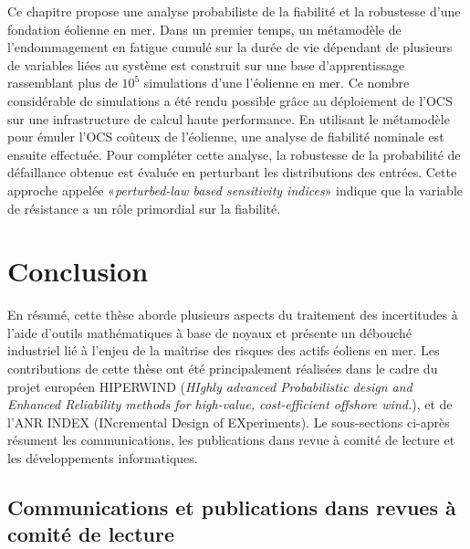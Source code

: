 Ce chapitre propose une analyse probabiliste de la fiabilit\'{e} et la robustesse d'une fondation \'{e}olienne en mer. 
Dans un premier temps, un m\'{e}tamodèle de l'endommagement en fatigue cumul\'{e} sur la dur\'{e}e de vie d\'{e}pendant de plusieurs de variables li\'{e}es au système est construit sur une base d'apprentissage rassemblant plus de $10^5$ simulations d'une l'\'{e}olienne en mer.
Ce nombre consid\'{e}rable de simulations a \'{e}t\'{e} rendu possible grâce au d\'{e}ploiement de l'OCS sur une infrastructure de calcul haute performance. 
En utilisant le m\'{e}tamodèle pour \'{e}muler l'OCS coûteux de l'\'{e}olienne, une analyse de fiabilit\'{e} nominale est ensuite effectu\'{e}e. 
Pour compl\'{e}ter cette analyse, la robustesse de la probabilit\'{e} de d\'{e}faillance obtenue est \'{e}valu\'{e}e en perturbant les distributions des entr\'{e}es. 
Cette approche appel\'{e}e «\textit{perturbed-law based sensitivity indices}» \citep{lemaitre_2015_PLI} indique que la variable de r\'{e}sistance a un rôle primordial sur la fiabilit\'{e}.



\section*{Conclusion}

En r\'{e}sum\'{e}, cette thèse aborde plusieurs aspects du traitement des incertitudes à l'aide d'outils math\'{e}matiques à base de noyaux et pr\'{e}sente un d\'{e}bouch\'{e} industriel li\'{e} à l'enjeu de la maîtrise des risques des actifs \'{e}oliens en mer. 
Les contributions de cette thèse ont \'{e}t\'{e} principalement r\'{e}alis\'{e}es dans le cadre du projet europ\'{e}en HIPERWIND (\textit{HIghly advanced Probabilistic design and Enhanced Reliability methods for high-value, cost-efficient offshore wind.}), et de l'ANR INDEX (INcremental Design of EXperiments). 
Le sous-sections ci-après r\'{e}sument les communications, les publications dans revue à comit\'{e} de lecture et les d\'{e}veloppements informatiques.


\newpage
\subsection*{Communications et publications dans revues à comit\'{e} de lecture}


